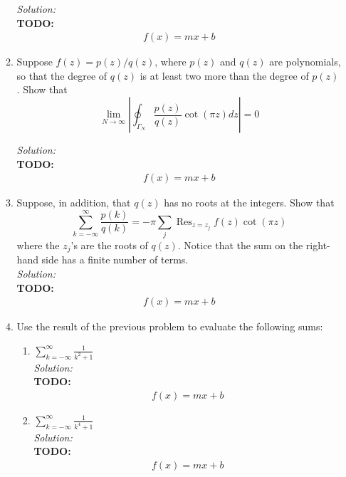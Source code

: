 \documentclass[10pt]{amsart}
\theoremstyle{nonumberplain}
\begin{document}
\begin{enumerate}[label={\bf {\arabic*}:}]
\begin{enumerate}
\noindent
\textit{Solution:} \\
\textbf{TODO:}
\begin{align*}
f(x) = mx + b
\end{align*}


\item Suppose $f(z)=p(z) / q(z)$, where $p(z)$ and $q(z)$ are polynomials, so that the degree of $q(z)$ is at least two more than the degree of $p(z)$. Show that
$$
\lim _{N \rightarrow \infty}\left|\oint_{\Gamma_N} \frac{p(z)}{q(z)} \cot (\pi z) d z\right|=0
$$
 
\noindent
\textit{Solution:} \\
\textbf{TODO:}
\begin{align*}
f(x) = mx + b
\end{align*}


\item Suppose, in addition, that $q(z)$ has no roots at the integers. Show that
$$
\sum_{k=-\infty}^{\infty} \frac{p(k)}{q(k)}=-\pi \sum_j \operatorname{Res}_{z=z_j} f(z) \cot (\pi z)
$$
where the $z_j$'s are the roots of $q(z)$. Notice that the sum on the
right-hand side has a finite number of terms. \\
 
\noindent
\textit{Solution:} \\
\textbf{TODO:}
\begin{align*}
f(x) = mx + b
\end{align*}

\newpage

\item Use the result of the previous problem to evaluate the following sums:
\begin{enumerate}
\item  $\displaystyle \sum_{k=-\infty}^{\infty} \frac{1}{k^2+1}$ \\
 
\noindent
\textit{Solution:} \\
\textbf{TODO:}
\begin{align*}
f(x) = mx + b
\end{align*}

\item  $\displaystyle \sum_{k=-\infty}^{\infty} \frac{1}{k^4+1}$ \\
 
\noindent
\textit{Solution:} \\
\textbf{TODO:}
\begin{align*}
f(x) = mx + b
\end{align*}



\end{enumerate}
\end{enumerate}
\end{enumerate}
\end{document}
